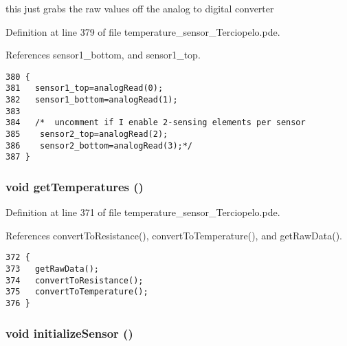 this just grabs the raw values off the analog to digital converter 



Definition at line 379 of file temperature\_\-sensor\_\-Terciopelo.pde.

References sensor1\_\-bottom, and sensor1\_\-top.

\begin{Code}\begin{verbatim}380 {
381   sensor1_top=analogRead(0);
382   sensor1_bottom=analogRead(1);
383 
384   /*  uncomment if I enable 2-sensing elements per sensor
385    sensor2_top=analogRead(2);
386    sensor2_bottom=analogRead(3);*/
387 }
\end{verbatim}
\end{Code}


\hypertarget{applet_2temperature__sensor___terciopelo_8pde_ea28af0c7128421a38589128bb39ef1c}{
\subsubsection[{getTemperatures}]{\setlength{\rightskip}{0pt plus 5cm}void getTemperatures ()}}
\label{applet_2temperature__sensor___terciopelo_8pde_ea28af0c7128421a38589128bb39ef1c}




Definition at line 371 of file temperature\_\-sensor\_\-Terciopelo.pde.

References convertToResistance(), convertToTemperature(), and getRawData().

\begin{Code}\begin{verbatim}372 {
373   getRawData();
374   convertToResistance();
375   convertToTemperature();
376 }
\end{verbatim}
\end{Code}


\hypertarget{applet_2temperature__sensor___terciopelo_8pde_f6c9587ccbcf223f8c79f508c2fef366}{
\subsubsection[{initializeSensor}]{\setlength{\rightskip}{0pt plus 5cm}void initializeSensor ()}}
\label{applet_2temperature__sensor___terciopelo_8pde_f6c9587ccbcf223f8c79f508c2fef366}


